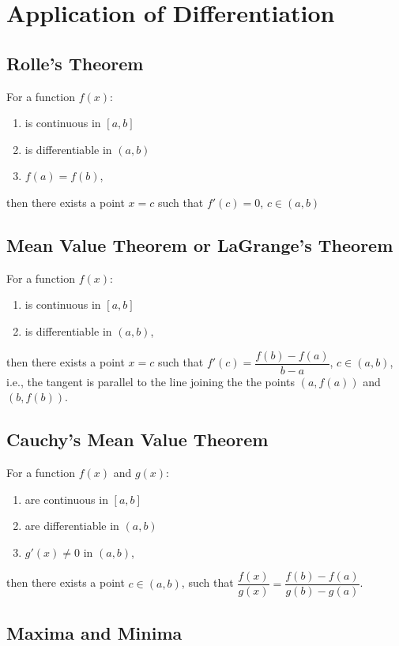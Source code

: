 \large{\chapter{Application of Differentiation}}
\section{Rolle's Theorem}
For a function $f(x)$:
\begin{enumerate}
	\item is continuous in $[a,b]$
	\item is differentiable in $(a,b)$
	\item $f(a)=f(b)$,
\end{enumerate}
then there exists a point $x=c$ such that $f'(c)=0$, $c\in(a,b)$

\section{Mean Value Theorem or LaGrange's Theorem}
For a function $f(x)$:
\begin{enumerate}
	\item is continuous in $[a,b]$
	\item is differentiable in $(a,b)$,
\end{enumerate}
then there exists a point $x=c$ such that $f'(c)=\dfrac{f(b)-f(a)}{b-a}$, $c\in(a,b)$, i.e., the tangent is parallel to the line joining the the points $(a,f(a))$ and $(b,f(b))$.

\section{Cauchy's Mean Value Theorem}
For a function $f(x)$ and $g(x)$:
\begin{enumerate}
	\item are continuous in $[a,b]$
	\item are differentiable in $(a,b)$
	\item $g'(x)\neq 0$ in $(a,b)$,
\end{enumerate}
then there exists a point $c\in(a,b)$, such that $\dfrac{f(x)}{g(x)}=\dfrac{f(b)-f(a)}{g(b)-g(a)}$.

\section{Maxima and Minima}
